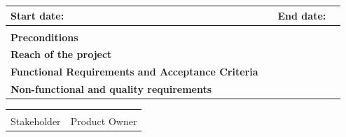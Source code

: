 \documentclass{article}
\begin{document}
\begin{tabular}{ |p{2cm}|p{2cm}|p{2cm}|p{2cm}|  }
	\hline
	\cellcolor[HTML]{98B5C6} \textbf{Start date:} & &\cellcolor[HTML]{98B5C6} \textbf{End date:} & \\
	
	\hline
	
	\rowcolor[HTML]{4F96C2}\multicolumn{4}{|c|}{\textbf{Analysis}} \\
	
	\hline
	
	\cellcolor[HTML]{98B5C6} \textbf{Preconditions} & \multicolumn{3}{c|}{}\\[2cm]
	
	\hline
	
	\cellcolor[HTML]{98B5C6} \textbf{Reach of the project} & \multicolumn{3}{c|}{}\\[3cm]
	
	\hline
	
	\cellcolor[HTML]{98B5C6} \textbf{Functional Requirements and Acceptance Criteria} & \multicolumn{3}{c|}{}\\[3cm]
	
	\hline
	
	\cellcolor[HTML]{98B5C6} \textbf{Non-functional and quality requirements} & \multicolumn{3}{c|}{}\\[3cm]
	
	\hline
	
	
\end{tabular}
\vfill
\noindent\begin{tabular}{ll}
	\makebox[2.5in]{\hrulefill} & \makebox[2.5in]{\hrulefill}\\
	\hspace*{0mm}\phantom{Approved: }Stakeholder & \hspace*{0mm}\phantom{Approved: }Product Owner
\end{tabular}

\newpage
\end{document}
